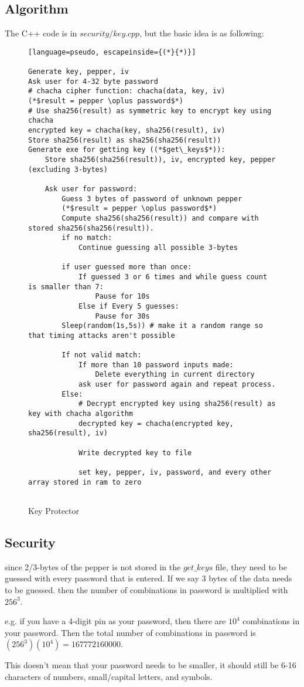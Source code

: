 \documentclass[a4paper,12pt]{article}
\begin{document}
\subsection{Algorithm}
The C++ code is in $security/key.cpp$, but the basic idea is as following:

\begin{figure}[htb]
\begin{small}
\begin{lstlisting}[language=pseudo, escapeinside={(*}{*)}]

Generate key, pepper, iv
Ask user for 4-32 byte password
# chacha cipher function: chacha(data, key, iv)
(*$result = pepper \oplus password$*)
# Use sha256(result) as symmetric key to encrypt key using chacha
encrypted key = chacha(key, sha256(result), iv)
Store sha256(result) as sha256(sha256(result))
Generate exe for getting key ((*$get\_keys$*)):
	Store sha256(sha256(result)), iv, encrypted key, pepper (excluding 3-bytes)

	Ask user for password:
		Guess 3 bytes of password of unknown pepper
		(*$result = pepper \oplus password$*)
		Compute sha256(sha256(result)) and compare with stored sha256(sha256(result)).
		if no match:
			Continue guessing all possible 3-bytes

		if user guessed more than once:
			If guessed 3 or 6 times and while guess count is smaller than 7:
				Pause for 10s
			Else if Every 5 guesses:
				Pause for 30s
		Sleep(random(1s,5s)) # make it a random range so that timing attacks aren't possible

		If not valid match:
			If more than 10 password inputs made:
				Delete everything in current directory
			ask user for password again and repeat process.
		Else:
			# Decrypt encrypted key using sha256(result) as key with chacha algorithm
			decrypted key = chacha(encrypted key, sha256(result), iv)

			Write decrypted key to file

			set key, pepper, iv, password, and every other array stored in ram to zero
			

\end{lstlisting}
\end{small}
\caption{Key Protector}\label{key_protector}
\end{figure}


\subsection{Security}

since 2/3-bytes of the pepper is not stored in the $get\_keys$ file, they need to be guessed with every password that is entered. If we say 3 bytes of the data needs to be guessed. then the number of combinations in password is multiplied with $256^3$.

e.g. if you have a 4-digit pin as your password, then there are $10^4$ combinations in your password. Then the total number of combinations in password is $(256^3)(10^4) = 167772160000$.

This doesn't mean that your password needs to be smaller, it should still be 6-16 characters of numbers, small/capital letters, and symbols.
\end{document}
